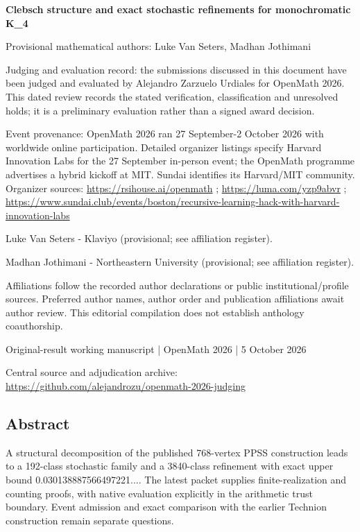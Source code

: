 \documentclass[11pt,a4paper]{article}
\begin{document}
{\LARGE\bfseries Clebsch structure and exact stochastic refinements for monochromatic K\_4\par}\medskip
{\small Provisional mathematical authors: Luke Van Seters, Madhan Jothimani\par}\medskip
{\small Judging and evaluation record: the submissions discussed in this document have been judged and evaluated by Alejandro Zarzuelo Urdiales for OpenMath 2026. This dated review records the stated verification, classification and unresolved holds; it is a preliminary evaluation rather than a signed award decision.\par}

{\small Event provenance: OpenMath 2026 ran 27 September-2 October 2026 with worldwide online participation. Detailed organizer listings specify Harvard Innovation Labs for the 27 September in-person event; the OpenMath programme advertises a hybrid kickoff at MIT. Sundai identifies its Harvard/MIT community. Organizer sources: \url{https://rsihouse.ai/openmath} ; \url{https://luma.com/yzp9abvr} ; \url{https://www.sundai.club/events/boston/recursive-learning-hack-with-harvard-innovation-labs}\par}

{\small Luke Van Seters  -  Klaviyo (provisional; see affiliation register).\par}

{\small Madhan Jothimani  -  Northeastern University (provisional; see affiliation register).\par}

{\small Affiliations follow the recorded author declarations or public institutional/profile sources. Preferred author names, author order and publication affiliations await author review. This editorial compilation does not establish anthology coauthorship.\par}

{\small Original-result working manuscript | OpenMath 2026 | 5 October 2026\par}\medskip
{\small Central source and adjudication archive: \url{https://github.com/alejandrozu/openmath-2026-judging}\par}

\subsection{Abstract}
A structural decomposition of the published 768-vertex PPSS construction leads to a 192-class stochastic family and a 3840-class refinement with exact upper bound 0.030138887566497221.... The latest packet supplies finite-realization and counting proofs, with native evaluation explicitly in the arithmetic trust boundary. Event admission and exact comparison with the earlier Technion construction remain separate questions.
\end{document}

